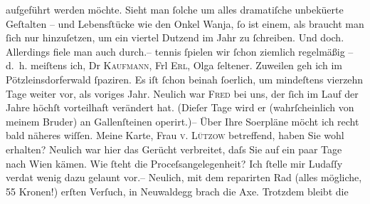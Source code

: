 \begin{ledgroupsized}[t]{13cm}
               aufgeführt werden möchte. Sieht man ſolche {\pb}um alles dramatiſche unbekü{\geminationm}erte Geſtalten – und
               Lebensſtücke wie den Onkel Wanja, ſo ist einem,
               als braucht man ſich nur hinzuſetzen, um ein viertel Dutzend im Jahr zu ſchreiben.
               Und doch. Allerdings fiele man auch durch.– \pend
           \pstart
           tennis ſpielen wir ſchon ziemlich regelmäßig – d. h. meiſtens ich, Dr \textsc{Kaufmann}, Frl \textsc{Erl}, Olga ſeltener. Zuweilen geh ich im Pötzleinsdorferwald ſpaziren. Es iſt ſchon beinah
                  ſo{\geminationm}erlich, um mindeſtens vierzehn Tage weiter vor,
               als voriges Jahr. Neulich war \textsc{Fred} bei uns, der ſich im Lauf der Jahre höchſt vorteilhaft verändert hat. (Dieſer
                  {\pb}Tage wird er (wahrſcheinlich von meinem
                  Bruder) an Gallenſteinen
               operirt.)– \pend
           \pstart
           Über Ihre So{\geminationm}erpläne möcht ich recht bald näheres
               wiſſen. Meine Karte, Frau \textsc{v. Lützow} betreffend, haben Sie wohl erhalten? Neulich war hier das Gerücht verbreitet,
               daſs Sie auf ein paar Tage nach Wien kämen. Wie
               ſteht die Proceſsangelegenheit? Ich ſtelle mir Ludaſſy verda{\geminationm}t wenig dazu gelaunt vor.– \pend
           \pstart
           Neulich, mit dem reparirten Rad (alles mögliche, 55 Kronen!) erſten Verſuch, in Neuwaldegg brach die Axe. Trotzdem bleibt die

\end{ledgroupsized}
